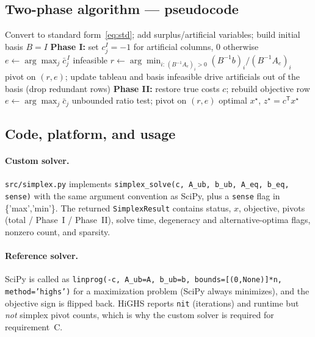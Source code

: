 \documentclass[10pt]{article}
\begin{document}
\subsection{Two-phase algorithm --- pseudocode}
\begin{algorithm}[t]
\caption{Two-phase tableau Simplex (maximization)}
\label{alg:simplex}
\begin{algorithmic}[1]
\State Convert to standard form~\eqref{eq:std}; add surplus/artificial
       variables; build initial basis $B = I$
\State \textbf{Phase I:} set $c^{I}_j = -1$ for artificial columns, $0$ otherwise
  \State $e \leftarrow \arg\max_j \bar{c}^{\,I}_j$ 
   \Return infeasible \EndIf
  \State $r \leftarrow \arg\min_{i:\,(B^{-1}A_e)_i>0} (B^{-1}b)_i / (B^{-1}A_e)_i$
  \State pivot on $(r,e)$; update tableau and basis
\EndWhile
{} \Return infeasible 
\EndIf
\State drive artificials out of the basis (drop redundant rows)
\State \textbf{Phase II:} restore true costs $c$; rebuild objective row
  \State $e \leftarrow \arg\max_j \bar{c}_j$
   \Return unbounded \EndIf
  \State ratio test; pivot on $(r,e)$
\EndWhile
\State \Return optimal $x^\star$, $z^\star = c^{\mathsf T} x^\star$
\end{algorithmic}
\end{algorithm}

\subsection{Code, platform, and usage}
\paragraph{Custom solver.} \texttt{src/simplex.py} implements
\texttt{simplex\_solve(c, A\_ub, b\_ub, A\_eq, b\_eq, sense)} with the same
argument convention as SciPy, plus a \texttt{sense} flag in
\{'max','min'\}.  The returned \texttt{SimplexResult} contains status, $x$,
objective, pivots (total / Phase~I / Phase~II), solve time, degeneracy and
alternative-optima flags, nonzero count, and sparsity.

\paragraph{Reference solver.} SciPy is called as
\texttt{linprog(-c, A\_ub=A, b\_ub=b, bounds=[(0,None)]*n, method='highs')}
for a maximization problem (SciPy always minimizes), and the objective sign
is flipped back.  HiGHS reports \texttt{nit} (iterations) and runtime but
\emph{not} simplex pivot counts, which is why the custom solver is required
for requirement~C.
\end{document}
